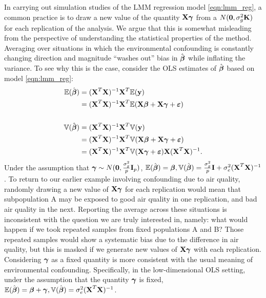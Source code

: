 In carrying out simulation studies of the LMM regression model \ref{eqn:lmm_reg}, a common practice \citep{Rakitsch2012, bhatnagar2019simultaneous} is to draw a new value of the quantity $\textbf{X}\boldsymbol{\gamma}$ from a $N(\boldsymbol{0}, \sigma^2_g \textbf{K})$ for each replication of the analysis.  We argue that this is somewhat misleading from the perspective of understanding the statistical properties of the method. Averaging over situations in which the environmental confounding is constantly changing direction and magnitude ``washes out'' bias in $\hat{\boldsymbol{\beta}}$ while inflating the variance. To see why this is the case, consider the OLS  estimates of $\hat{\boldsymbol{\beta}}$ based on model \ref{eqn:lmm_reg}:
\begin{align*}
    \mathbb{E}(\hat{\boldsymbol{\beta}}) &= (\textbf{X}^T \textbf{X})^{-1} \textbf{X}^T \mathbb{E}(\textbf{y})\\
    &=  (\textbf{X}^T \textbf{X})^{-1} \textbf{X}^T \mathbb{E}(\textbf{X}\boldsymbol{\beta} + \textbf{X}\boldsymbol{\gamma} + \boldsymbol{\varepsilon})\\
    &\quad\\
    \mathbb{V}(\hat{\boldsymbol{\beta}}) &= (\textbf{X}^T \textbf{X})^{-1} \textbf{X}^T \mathbb{V}(\textbf{y})\\
    &=  (\textbf{X}^T \textbf{X})^{-1} \textbf{X}^T \mathbb{V}(\textbf{X}\boldsymbol{\beta} + \textbf{X}\boldsymbol{\gamma} + \boldsymbol{\varepsilon})\\
    &=  (\textbf{X}^T \textbf{X})^{-1} \textbf{X}^T \mathbb{V}(\textbf{X}\boldsymbol{\gamma} + \boldsymbol{\varepsilon}) \textbf{X}  (\textbf{X}^T \textbf{X})^{-1}.
\end{align*}
Under the assumption that $\boldsymbol{\gamma} \sim N(\boldsymbol{0}, \frac{\sigma^2_g}{p} \textbf{I}_p)$, $\mathbb{E}(\hat{\boldsymbol{\beta}}) = \boldsymbol{\beta}, \mathbb{V}(\hat{\boldsymbol{\beta}}) = \frac{\sigma^2_g}{p}\textbf{I} + \sigma^2_e (\textbf{X}^T \textbf{X})^{-1}$ . To return to our earlier example involving confounding due to air quality, randomly drawing a new value of $\textbf{X}\boldsymbol{\gamma}$ for each replication would mean that subpopulation A may be exposed to good air quality in one replication, and bad air quality in the next. Reporting the average across these situations is inconsistent with the question we are truly interested in, namely: what would happen if we took repeated samples from fixed populations A and B? Those repeated samples would show a systematic bias due to the difference in air quality, but this is masked if we generate new values of $\textbf{X}\boldsymbol{\gamma}$ with each replication. Considering $\boldsymbol{\gamma}$ as a fixed quantity is more consistent with the usual meaning of environmental confounding. Specifically, in the low-dimensional OLS setting, under the assumption that the quantity $\boldsymbol{\gamma}$ is fixed, $\mathbb{E}(\hat{\boldsymbol{\beta}}) = \boldsymbol{\beta} + \boldsymbol{\gamma}, \mathbb{V}(\hat{\boldsymbol{\beta}}) = \sigma^2_e (\textbf{X}^T \textbf{X})^{-1}$. 

